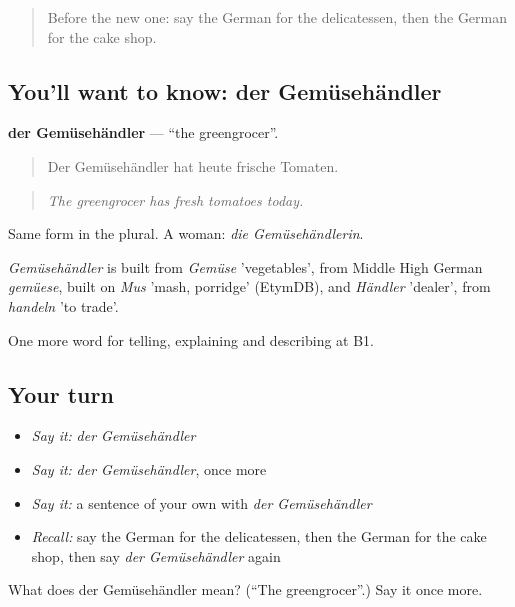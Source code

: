\begin{quote}
Before the new one: say the German for the delicatessen, then the German for the cake shop.
\end{quote}

\subsection*{You'll want to know: der Gemüsehändler}
\textbf{der Gemüsehändler} — \textquotedblleft{}the greengrocer\textquotedblright{}.

\begin{quote}
Der Gemüsehändler hat heute frische Tomaten.
\end{quote}

\begin{quote}
\emph{The greengrocer has fresh tomatoes today.}
\end{quote}

Same form in the plural. A woman: \emph{die Gemüsehändlerin}.

\begin{cousinweb}
\emph{Gemüsehändler} is built from \emph{Gemüse} 'vegetables', from Middle High German \emph{gemüese}, built on \emph{Mus} 'mash, porridge' (EtymDB), and \emph{Händler} 'dealer', from \emph{handeln} 'to trade'.
\end{cousinweb}

\begin{grammarlens}[title={What you've built}]
One more word for telling, explaining and describing at B1.
\end{grammarlens}

\subsection*{Your turn}
\begin{itemize}
\raggedright
  \item \emph{Say it:} \emph{der Gemüsehändler}
  \item \emph{Say it:} \emph{der Gemüsehändler}, once more
  \item \emph{Say it:} a sentence of your own with \emph{der Gemüsehändler}
  \item \emph{Recall:} say the German for the delicatessen, then the German for the cake shop, then say \emph{der Gemüsehändler} again
\end{itemize}

\begin{tcolorbox}[breakable,colback=teal!4,colframe=teal!35!black,title={Before you move on}]
What does der Gemüsehändler mean? (\textquotedblleft{}The greengrocer\textquotedblright{}.) Say it once more.
\end{tcolorbox}
